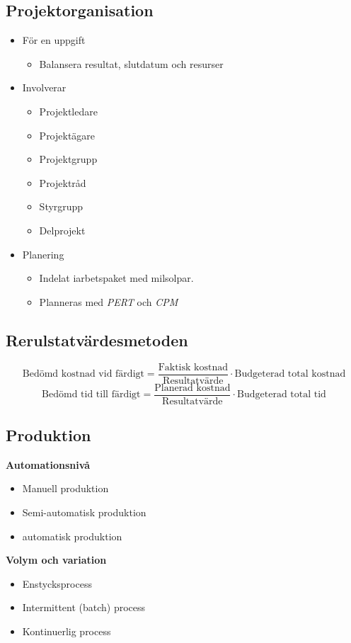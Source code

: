 \subsection{Projektorganisation}
\begin{itemize}
    \item För en uppgift
    \begin{itemize}
        \item Balansera resultat, slutdatum och resurser
    \end{itemize}
    \item Involverar
    \begin{itemize}
        \item Projektledare
        \item Projektägare
        \item Projektgrupp
        \item Projektråd 
        \item Styrgrupp
        \item Delprojekt
    \end{itemize}
    \item Planering
    \begin{itemize}
        \item Indelat iarbetspaket med milsolpar.
        \item Planneras med \textit{PERT} och \textit{CPM} %
    \end{itemize}
\end{itemize}

\subsection{Rerulstatvärdesmetoden}
\begin{equation*}
    \text{Bedömd kostnad vid färdigt} = \frac{\text{Faktisk kostnad}}{\text{Resultatvärde}} 
    \cdot \text{Budgeterad total kostnad}
\end{equation*}
\begin{equation*}
    \text{Bedömd tid till färdigt} = \frac{\text{Planerad kostnad}}{\text{Resultatvärde}} 
    \cdot \text{Budgeterad total tid}
\end{equation*}

\subsection{Produktion}
\textbf{Automationsnivå}
\begin{itemize}
    \item Manuell produktion
    \item Semi-automatisk produktion
    \item automatisk produktion
\end{itemize}
\textbf{Volym och variation}
\begin{itemize}
    \item Enstycksprocess
    \item Intermittent (batch) process 
    \item Kontinuerlig process
\end{itemize}

